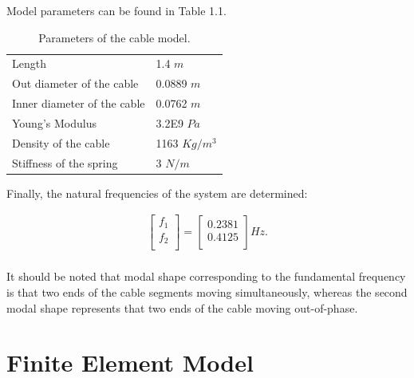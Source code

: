 \documentclass[paper=a4, fontsize=11pt]{scrartcl} %
\numberwithin{equation}{section} %
\numberwithin{figure}{section} %
\numberwithin{table}{section} %
\begin{document}
Model parameters can be found in Table 1.1.

\begin{table}
  \centering
  \begin{tabular}{ll}
    \hline    
    Length	&   1.4 $m$ \\
    Out diameter of the cable &	0.0889 $m$ \\
    Inner diameter of the cable &	0.0762 $m$ \\
    Young's Modulus	& 3.2E9 $Pa$\\
    Density of the cable & 	 1163 $Kg/m^{3}$\\
    Stiffness of the spring	 &  3 $N/m$ \\
    \hline
  \end{tabular}
  \caption{Parameters of the cable model.}
  \label{tab:cable-parameter}
\end{table}

Finally, the natural frequencies of the system are determined:

\begin{align}
\left[\begin{matrix}f_1\\f_2\\\end{matrix}\right]=\left[\begin{matrix}0.2381\\0.4125\\\end{matrix}\right]
  Hz.\\
\end{align}







It should be noted that modal shape corresponding to the fundamental
frequency is that two ends of the cable segments moving
simultaneously, whereas the second modal shape represents that two
ends of the cable moving out-of-phase.

\section{Finite Element Model}
\label{sec:finite-element-model}
\end{document}
